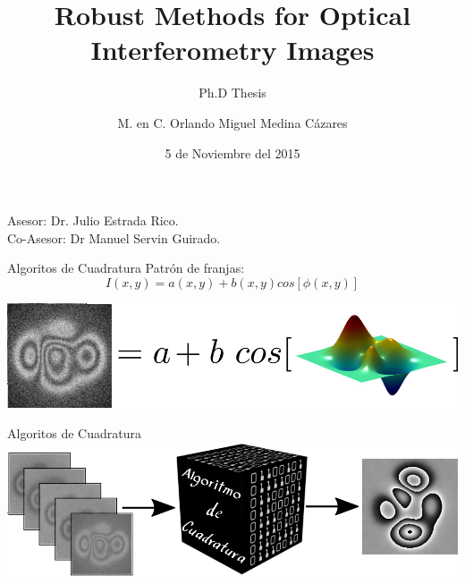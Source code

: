\documentclass[]{beamer}
\title{Robust Methods for Optical \\ Interferometry
    Images}
\subtitle[short version]{Ph.D Thesis}
\author{M. en C. Orlando Miguel Medina C\'azares}
\date{5 de Noviembre del 2015}
\institute[CIO]{Centro de Investigaciones en \'Optica}
\begin{document}
\begin{frame}[plain]
  \maketitle
  \footnotesize{
    Asesor: Dr. Julio Estrada Rico. \\
    Co-Asesor: Dr Manuel Servin Guirado.
  }
\end{frame}
\begin{frame}{Algoritos de Cuadratura}
  Patr\'on de franjas:
  \begin{equation}
    I(x,y)=a(x,y)+b(x,y)cos[\phi(x,y)]
  \end{equation}
  \begin{center}
    \includegraphics[scale=0.4]{Images/Interferogram.png}
  \end{center}
\end{frame}
\begin{frame}{Algoritos de Cuadratura}
  \includegraphics[scale=0.4]{Images/QuadratureFiltersScheme2.png}
\end{frame}
\end{document}
